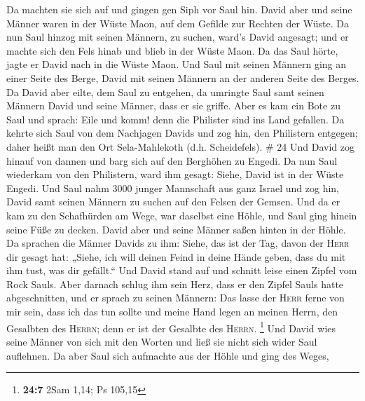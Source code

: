  Da machten sie sich auf und gingen gen Siph vor Saul
hin. David aber und seine Männer waren in der Wüste Maon, auf dem
Gefilde zur Rechten der Wüste.  Da nun Saul hinzog mit
seinen Männern, zu suchen, ward's David angesagt; und er machte sich den
Fels hinab und blieb in der Wüste Maon. Da das Saul hörte, jagte er
David nach in die Wüste Maon.  Und Saul mit seinen
Männern ging an einer Seite des Berge, David mit seinen Männern an der
anderen Seite des Berges. Da David aber eilte, dem Saul zu entgehen, da
umringte Saul samt seinen Männern David und seine Männer, dass er sie
griffe.  Aber es kam ein Bote zu Saul und sprach: Eile
und komm! denn die Philister sind ins Land gefallen.  Da
kehrte sich Saul von dem Nachjagen Davids und zog hin, den Philistern
entgegen; daher heißt man den Ort Sela-Mahlekoth (d.h. Scheidefels). \#
24  Und David zog hinauf von dannen und barg sich auf den
Berghöhen zu Engedi.  Da nun Saul wiederkam von den
Philistern, ward ihm gesagt: Siehe, David ist in der Wüste Engedi.
 Und Saul nahm 3000 junger Mannschaft aus ganz Israel und
zog hin, David samt seinen Männern zu suchen auf den Felsen der Gemsen.
 Und da er kam zu den Schafhürden am Wege, war daselbst
eine Höhle, und Saul ging hinein seine Füße zu decken. David aber und
seine Männer saßen hinten in der Höhle.  Da sprachen die
Männer Davids zu ihm: Siehe, das ist der Tag, davon der \textsc{Herr}
dir gesagt hat: „Siehe, ich will deinen Feind in deine Hände geben, dass
du mit ihm tust, was dir gefällt.`` Und David stand auf und schnitt
leise einen Zipfel vom Rock Sauls.  Aber darnach schlug
ihm sein Herz, dass er den Zipfel Sauls hatte abgeschnitten,
 und er sprach zu seinen Männern: Das lasse der
\textsc{Herr} ferne von mir sein, dass ich das tun sollte und meine Hand
legen an meinen Herrn, den Gesalbten des \textsc{Herrn}; denn er ist der
Gesalbte des \textsc{Herrn}. \footnote{\textbf{24:7} 2Sam 1,14; Ps
  105,15}  Und David wies seine Männer von sich mit den
Worten und ließ sie nicht sich wider Saul auflehnen. Da aber Saul sich
aufmachte aus der Höhle und ging des Weges,

